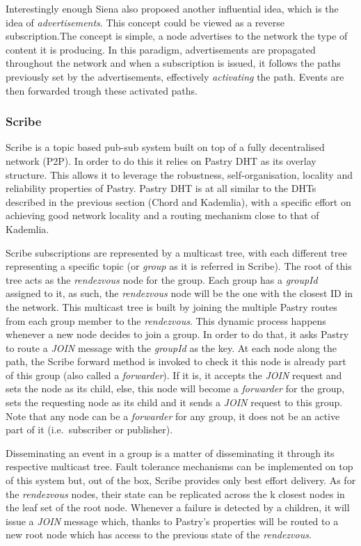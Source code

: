 Interestingly enough Siena also proposed another influential idea, which
is the idea of \emph{advertisements}. This concept could be viewed as a
reverse subscription.The concept is simple, a node advertises to the
network the type of content it is producing. In this paradigm,
advertisements are propagated throughout the network and when a
subscription is issued, it follows the paths previously set by the
advertisements, effectively \emph{activating} the path. Events are then
forwarded trough these activated paths.

\subsubsection{Scribe}\label{scribe}

Scribe \cite{Castro2002} is a topic based pub-sub system built
on top of a fully decentralised network (P2P). In order to do this it
relies on Pastry DHT as its overlay structure. This allows it to
leverage the robustness, self-organisation, locality and reliability
properties of Pastry. Pastry DHT is at all similar to the DHTs described
in the previous section (Chord and Kademlia), with a specific effort on
achieving good network locality and a routing mechanism close to that of
Kademlia.

Scribe subscriptions are represented by a multicast tree, with each
different tree representing a specific topic (or \emph{group} as it is
referred in Scribe). The root of this tree acts as the \emph{rendezvous}
node for the group. Each group has a \emph{groupId} assigned to it, as
such, the \emph{rendezvous} node will be the one with the closest ID in
the network. This multicast tree is built by joining the multiple Pastry
routes from each group member to the \emph{rendezvous}. This dynamic
process happens whenever a new node decides to join a group. In order to
do that, it asks Pastry to route a \emph{JOIN} message with the
\emph{groupId} as the key. At each node along the path, the Scribe
forward method is invoked to check it this node is already part of this
group (also called a \emph{forwarder}). If it is, it accepts the
\emph{JOIN} request and sets the node as its child, else, this node will
become a \emph{forwarder} for the group, sets the requesting node as its
child and it sends a \emph{JOIN} request to this group. Note that any
node can be a \emph{forwarder} for any group, it does not be an active
part of it (i.e.~subscriber or publisher).

Disseminating an event in a group is a matter of disseminating it
through its respective multicast tree. Fault tolerance mechanisms can be
implemented on top of this system but, out of the box, Scribe provides
only best effort delivery. As for the \emph{rendezvous} nodes, their
state can be replicated across the k closest nodes in the leaf set of
the root node. Whenever a failure is detected by a children, it will
issue a \emph{JOIN} message which, thanks to Pastry's properties will be
routed to a new root node which has access to the previous state of the
\emph{rendezvous}.

